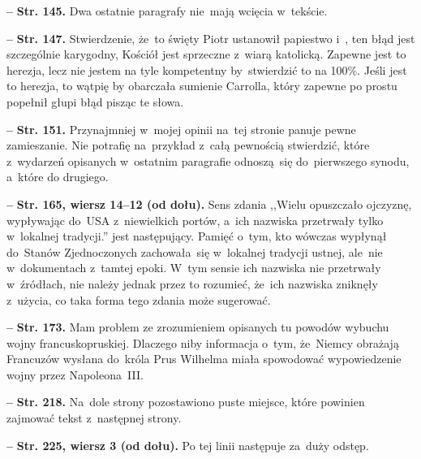 \documentclass[a4paper,11pt]{article}  %
\newcommand{\spaceFour}{0.5em}
\newcommand{\tb}{\textbf}
\newcommand{\noi}{\noindent}
\newcommand{\start}{\noi \tb{--} {}}
\newcommand{\Str}[1]{\tb{Str. #1.}}
\newcommand{\StrWd}[2]{\tb{Str. #1, wiersz #2 (od dołu).}}
\begin{document}
\vspace{\spaceFour}


\start \Str{145} Dwa ostatnie paragrafy nie~mają wcięcia w~tekście.

\vspace{\spaceFour}


\start \Str{147} Stwierdzenie, że~to święty Piotr ustanowił papiestwo
i~, ten błąd jest szczególnie karygodny, Kościół jest sprzeczne
z~wiarą katolicką. Zapewne jest to herezja, lecz nie jestem na tyle
kompetentny by~stwierdzić to na 100\%. Jeśli jest to herezja, to
wątpię by obarczała sumienie Carrolla, który zapewne po prostu
popełnił głupi błąd pisząc te słowa.

\vspace{\spaceFour}


\start \Str{151} Przynajmniej w~mojej opinii na~tej stronie panuje
pewne zamieszanie. Nie potrafię na~przykład z~całą pewnością
stwierdzić, które z~wydarzeń opisanych w~ostatnim paragrafie
odnoszą~się do~pierwszego synodu, a~które do drugiego.

\vspace{\spaceFour}


\start \StrWd{165}{14--12} Sens zdania ,,Wielu opuszczało ojczyznę,
wypływając do~USA z~niewielkich portów, a~ich nazwiska przetrwały
tylko w~lokalnej tradycji.'' jest następujący. Pamięć o~tym, kto
wówczas wypłynął do~Stanów Zjednoczonych zachowała~się w~lokalnej
tradycji ustnej, ale~nie w~dokumentach z~tamtej epoki. W~tym sensie
ich nazwiska nie przetrwały w~źródłach, nie należy jednak przez to
rozumieć, że~ich nazwiska zniknęły z~użycia, co taka forma tego zdania
może sugerować.

\vspace{\spaceFour}


\start \Str{173} Mam problem ze zrozumieniem opisanych tu powodów
wybuchu wojny francusko\dywiz pruskiej. Dlaczego niby informacja
o~tym, że~Niemcy obrażają Francuzów wysłana do~króla Prus Wilhelma
miała spowodować wypowiedzenie wojny przez Napoleona~III.

\vspace{\spaceFour}


\start \Str{218} Na~dole strony pozostawiono puste miejsce, które
powinien zajmować tekst z~następnej strony.

\vspace{\spaceFour}


\start \StrWd{225}{3} Po tej linii następuje za~duży odstęp.

\vspace{\spaceFour}
\end{document}
